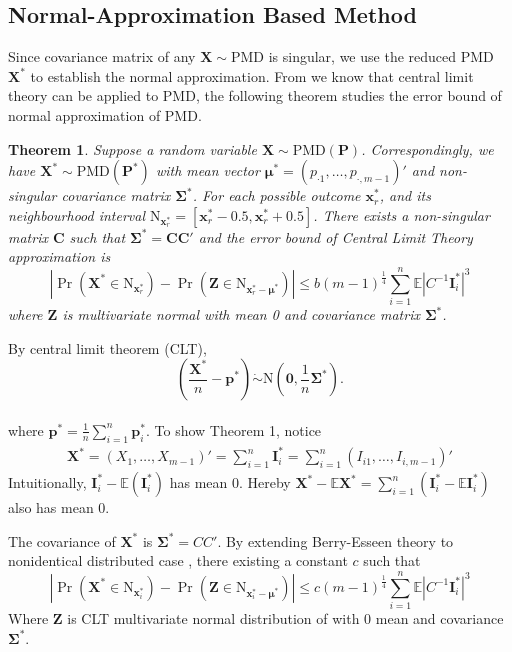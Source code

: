 \documentclass[12pt]{article}
\newcommand{\zerovec}{{\boldsymbol{0}}}
\newcommand{\Ivec}{{\boldsymbol{I}}}
\newcommand{\EE}{\mathbb{E}}
\newcommand{\Xmat}{\mathbf{X}}
\newcommand{\Cmat}{\mathbf{C}}
\newcommand{\Zmat}{\mathbf{Z}}
\newcommand{\Pmat}{\mathbf{P}}
\newcommand{\pvec}{\boldsymbol{p}}
\newcommand{\N}{\textrm{N}}
\newcommand{\PMD}{\textrm{PMD}}
\newcommand{\Xvec}{\boldsymbol{X}}
\newcommand{\xvec}{\boldsymbol{x}}
\newcommand{\muvec}{\boldsymbol{\mu}}
\newcommand{\Sig}{\boldsymbol{\Sigma}}
\newcommand{\mvec}{\boldsymbol{\mu}}
\newtheorem{thm}{Theorem}
\begin{document}
\subsection{Normal-Approximation Based Method}
Since covariance matrix of any $\Xvec \sim \PMD$ is singular, we use the reduced $\PMD$ $\Xvec^{\ast}$ to establish the normal approximation. From   we know that central limit theory can be applied to $\PMD$, the following theorem studies the error bound of normal approximation of $\PMD$.
\begin{thm}
Suppose a random variable $\Xvec \sim \PMD(\Pmat)$. Correspondingly, we have $\Xvec^{\ast} \sim \PMD(\Pmat^{\ast})$ with mean vector $\mvec^{\ast} = \left( p_{\cdot1} ,\dots,p_{\cdot,m-1}\right)'$ and non-singular covariance matrix $\Sig^{\ast}$. For each possible outcome $\xvec_r^{\ast}$, and its neighbourhood interval $\N_{\xvec_r^{\ast}} = [\xvec_r^{\ast}-0.5, \xvec_r^{\ast}+0.5]$. There exists a non-singular matrix $\Cmat$ such that $\Sig^{\ast} = \Cmat\Cmat'$ and the error bound of Central Limit Theory approximation is
\begin{equation*}
    |\Pr(\Xmat^{\ast} \in \N_{\xvec_r^{\ast}}) - \Pr(\Zmat \in \N_{\xvec_r^{\ast}-\mvec^{\ast}})| \leq b (m-1)^{\frac{1}{4}} \sum_{i=1}^{n}\EE|C^{-1}\Ivec_{i}^{\ast}|^3
\end{equation*}
where $\Zmat$ is multivariate normal with mean 0 and covariance matrix $\Sig^{\ast}$.
\end{thm}
By central limit theorem (CLT),
$$\left(\frac{\Xvec^{\ast}}{n}-\pvec^{\ast}\right)\dot\sim \N\left(\zerovec, \frac{1}{n}\Sig^{\ast}\right).$$\\
where $\pvec^{\ast} = \frac{1}{n}\sum_{i=1}^{n}\pvec_i^{\ast}$.
To show Theorem 1, notice
\begin{align*}
    \Xvec^{\ast} = (X_1,\dots,X_{m-1})' = \sum_{i=1}^{n} \Ivec_{i}^{\ast}= \sum_{i=1}^{n} (I_{i1},\dots,I_{i,m-1})'
\end{align*}
Intuitionally, $\Ivec_i^{\ast} - \EE(\Ivec_i^{\ast})$ has mean 0. Hereby $\Xvec^{\ast} - \EE \Xvec^{\ast} = \sum_{i=1}^{n} (\Ivec_i^{\ast} - \EE \Ivec_{i}^{\ast})$ also has mean 0. 

The covariance of $\Xvec^{\ast}$ is $\Sig^{\ast} = CC'$. By extending Berry-Esseen theory to nonidentical distributed case \cite{article}, there existing  a constant $c$ such that
\begin{equation*}
    |\Pr\left(\Xmat^{\ast} \in \N_{\xvec_i^{\ast}}\right) - \Pr\left(\Zmat \in \N_{\xvec_i^{\ast}-\muvec^{\ast}} \right)| \leq c(m-1)^{\frac{1}{4}}\sum_{i=1}^{n} \EE \left|C^{-1}\Ivec_i^{\ast}\right|^3
\end{equation*}
Where $\Zmat$ is CLT multivariate normal distribution of with 0 mean and covariance $\Sig^{\ast}$.
\end{document}
